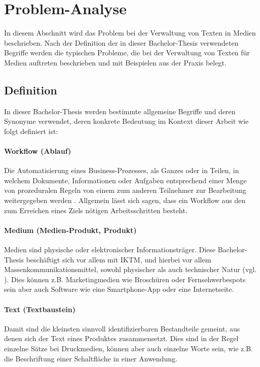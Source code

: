 \section{Problem-Analyse}

In diesem Abschnitt wird das Problem bei der Verwaltung von Texten in Medien beschrieben. Nach der Definition der in dieser Bachelor-Thesis verwendeten Begriffe werden die typischen Probleme, die bei der Verwaltung von Texten für Medien auftreten beschrieben und mit Beispielen aus der Praxis belegt.

\subsection{Definition}
\label{l:def}

In dieser Bachelor-Thesis werden bestimmte allgemeine Begriffe und deren Synonyme verwendet, deren konkrete Bedeutung im Kontext dieser Arbeit wie folgt definiert ist:

\paragraph{Workflow (Ablauf)} Die Automatisierung eines Business-Prozesses, als Ganzes oder in Teilen, in welchem Dokumente, Informationen oder Aufgaben entsprechend einer Menge von prozeduralen Regeln von einem zum anderen Teilnehmer zur Bearbeitung weitergegeben werden \cite[S.8]{wmc}. Allgemein lässt sich sagen, dass ein Workflow aus den zum Erreichen eines Ziels nötigen Arbeitsschritten besteht.

\paragraph{Medium (Medien-Produkt, Produkt)} Medien sind physische oder elektronischer Informationsträger. Diese Bachelor-Thesis beschäftigt sich vor allem mit \ac{IKTM}, und hierbei vor allem Massenkommunikationsmittel, sowohl physischer als auch technischer Natur (vgl. \cite[S.199–201]{schanze2002metzler}). Dies können z.B. Marketingmedien wie Broschüren oder Fernsehwerbespots sein aber auch Software wie eine Smartphone-App oder eine Internetseite. 

\paragraph{Text (Textbaustein)} Damit sind die kleinsten sinnvoll identifizierbaren Bestandteile gemeint, aus denen sich der Text eines Produktes zusammensetzt. Dies sind in der Regel einzelne Sätze bei Druckmedien, können aber auch einzelne Worte sein, wie z.B. die Beschriftung einer Schaltfläche in einer Anwendung.


